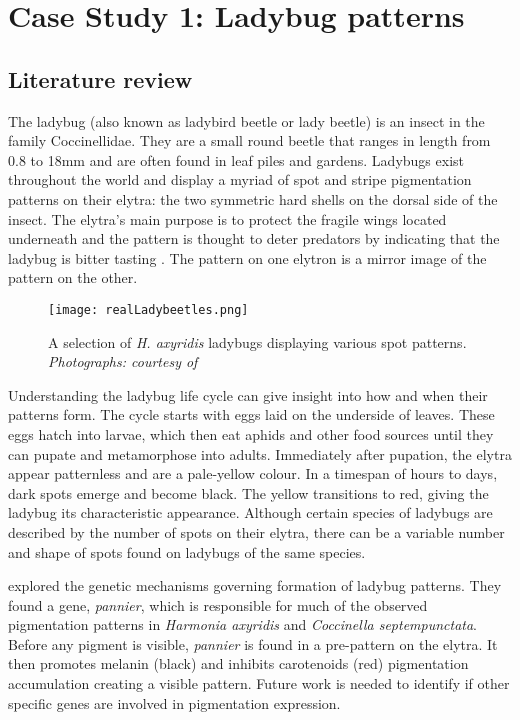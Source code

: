 \chapter{Case Study 1: Ladybug patterns}

\section{Literature review}
The ladybug (also known as ladybird beetle or lady beetle) is an insect in the family Coccinellidae. They are a small round beetle that ranges in length from 0.8 to 18mm \citep{King1996} and are often found in leaf piles and gardens. Ladybugs exist throughout the world and display a myriad of spot and stripe pigmentation patterns on their elytra: the two symmetric hard shells on the dorsal side of the insect. The elytra's main purpose is to protect the fragile wings located underneath and the pattern is thought to deter predators by indicating that the ladybug is bitter tasting \citep{King1996}. The pattern on one elytron is a mirror image of the pattern on the other. 

\begin{figure}[ht]
	\centering
	\texttt{[image: realLadybeetles.png]}
	\caption{A selection of \textit{H. axyridis} ladybugs displaying various spot patterns. \textit{Photographs: courtesy of \citet{entomart2019}}}
	\label{fig:realLadyBugPatterns}
\end{figure}

Understanding the ladybug life cycle can give insight into how and when their patterns form. The cycle starts with eggs laid on the underside of leaves. These eggs hatch into larvae, which then eat aphids and other food sources until they can pupate and metamorphose into adults. Immediately after pupation, the elytra appear patternless and are a pale-yellow colour. In a timespan of hours to days, dark spots emerge and become black. The yellow transitions to red, giving the ladybug its characteristic appearance. Although certain species of ladybugs are described by the number of spots on their elytra, there can be a variable number and shape of spots found on ladybugs of the same species.

\citet{Ando2018} explored the genetic mechanisms governing formation of ladybug patterns. They found a gene, \textit{pannier}, which is responsible for much of the observed pigmentation patterns in \textit{Harmonia axyridis} and \textit{Coccinella septempunctata}. Before any pigment is visible, \textit{pannier} is found in a pre-pattern on the elytra. It then promotes melanin (black) and inhibits carotenoids (red) pigmentation accumulation creating a visible pattern. Future work is needed to identify if other specific genes are involved in pigmentation expression.

